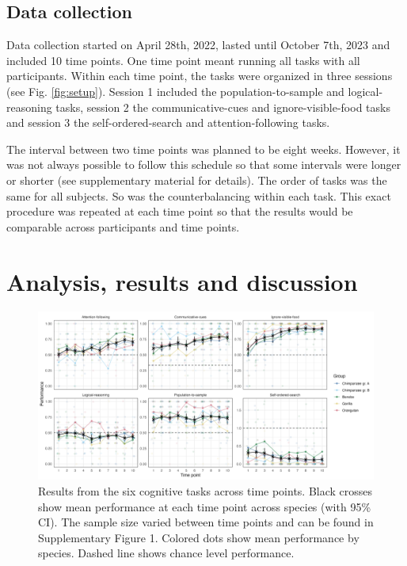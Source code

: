 \documentclass[
  man,floatsintext]{apa6}
\begin{document}
\hypertarget{data-collection}{%
\subsection{Data collection}\label{data-collection}}

Data collection started on April 28th, 2022, lasted until October 7th, 2023 and included 10 time points. One time point meant running all tasks with all participants. Within each time point, the tasks were organized in three sessions (see Fig. \ref{fig:setup}). Session 1 included the population-to-sample and logical-reasoning tasks, session 2 the communicative-cues and ignore-visible-food tasks and session 3 the self-ordered-search and attention-following tasks.

The interval between two time points was planned to be eight weeks. However, it was not always possible to follow this schedule so that some intervals were longer or shorter (see supplementary material for details). The order of tasks was the same for all subjects. So was the counterbalancing within each task. This exact procedure was repeated at each time point so that the results would be comparable across participants and time points.

\hypertarget{analysis-results-and-discussion}{%
\section{Analysis, results and discussion}\label{analysis-results-and-discussion}}

\begin{figure}
\includegraphics[width=1\linewidth]{../visuals/perf} \caption{Results from the six cognitive tasks across time points. Black crosses show mean performance at each time point across species (with 95\% CI). The sample size varied between time points and can be found in Supplementary Figure 1. Colored dots show mean performance by species. Dashed line shows chance level performance.}\label{fig:perfplot}
\end{figure}
\end{document}
